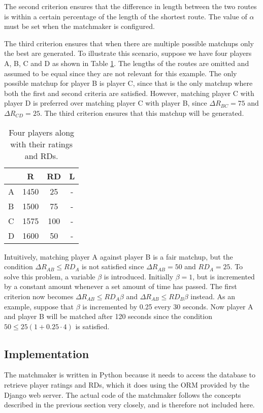 The second criterion ensures that the difference in length between the two routes is within a certain percentage of the length of the shortest route.
The value of $\alpha$ must be set when the matchmaker is configured.

The third criterion ensures that when there are multiple possible matchups only the best are generated.
To illustrate this scenario, suppose we have four players A, B, C and D as shown in Table \ref{tab:matchmaker_ex}.
The lengths of the routes are omitted and assumed to be equal since they are not relevant for this example.
The only possible matchup for player B is player C, since that is the only matchup where both the first and second criteria are satisfied.
However, matching player C with player D is preferred over matching player C with player B, since $\Delta R_{BC} = 75$ and $\Delta R_{CD} = 25$.
The third criterion ensures that this matchup will be generated.

\begin{table}[!ht]
	\centering
	\begin{tabular}{l c c c}
			& R		& RD	& L \\
		\hline
		A	& 1450	& 25	& - \\
		B	& 1500	& 75	& - \\
		C	& 1575	& 100	& - \\
		D	& 1600	& 50	& -
	\end{tabular}
	\caption{Four players along with their ratings and RDs.}
	\label{tab:matchmaker_ex}
\end{table}

Intuitively, matching player A against player B is a fair matchup, but the condition $\Delta R_{AB} \leq RD_A$ is not satisfied since $\Delta R_{AB} = 50$ and $RD_A = 25$.
To solve this problem, a variable $\beta$ is introduced.
Initially $\beta = 1$, but is incremented by a constant amount whenever a set amount of time has passed.
The first criterion now becomes $\Delta R_{AB} \leq RD_A\beta$ and $\Delta R_{AB} \leq RD_B\beta$ instead.
As an example, suppose that $\beta$ is incremented by 0.25 every 30 seconds.
Now player A and player B will be matched after 120 seconds since the condition $50 \leq 25\left(1+0.25\cdot4\right)$ is satisfied.

\subsection{Implementation}
The matchmaker is written in Python because it needs to access the database to retrieve player ratings and RDs, which it does using the ORM provided by the Django web server.
The actual code of the matchmaker follows the concepts described in the previous section very closely, and is therefore not included here.

